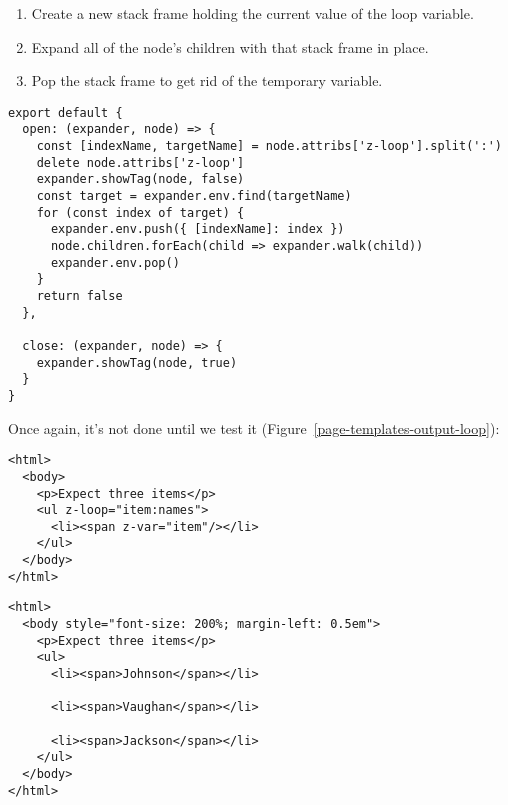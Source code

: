 \documentclass[krantzl]{krantz}
\newcommand{\figref}[1]{Figure~\ref{#1}}
\begin{document}
\begin{enumerate}

\item 

Create a new stack frame holding the current value of the loop variable.



\item 

Expand all of the node’s children with that stack frame in place.



\item 

Pop the stack frame to get rid of the temporary variable.



\end{enumerate}


\begin{lstlisting}[frame=tblr]
export default {
  open: (expander, node) => {
    const [indexName, targetName] = node.attribs['z-loop'].split(':')
    delete node.attribs['z-loop']
    expander.showTag(node, false)
    const target = expander.env.find(targetName)
    for (const index of target) {
      expander.env.push({ [indexName]: index })
      node.children.forEach(child => expander.walk(child))
      expander.env.pop()
    }
    return false
  },

  close: (expander, node) => {
    expander.showTag(node, true)
  }
}
\end{lstlisting}



Once again,
it’s not done until we test it (\figref{page-templates-output-loop}):


\begin{lstlisting}[frame=tblr,backgroundcolor=\color{black!5}]
<html>
  <body>
    <p>Expect three items</p>
    <ul z-loop="item:names">
      <li><span z-var="item"/></li>
    </ul>
  </body>
</html>
\end{lstlisting}



\begin{lstlisting}[frame=tblr,backgroundcolor=\color{black!5}]
<html>
  <body style="font-size: 200%; margin-left: 0.5em">
    <p>Expect three items</p>
    <ul>
      <li><span>Johnson</span></li>

      <li><span>Vaughan</span></li>

      <li><span>Jackson</span></li>
    </ul>
  </body>
</html>
\end{lstlisting}
\end{document}
